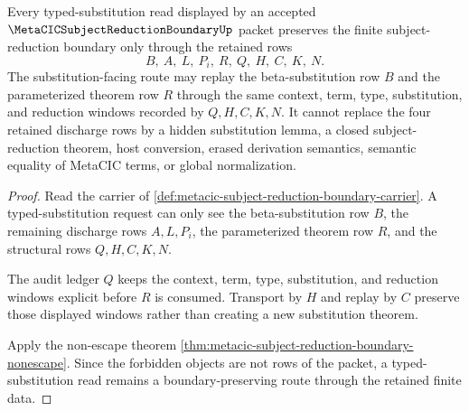 \begin{theorem}
\label{thm:metacic-subject-reduction-boundary-typed-substitution}
Every typed-substitution read displayed by an accepted $\MetaCICSubjectReductionBoundaryUp$ packet preserves the finite subject-reduction boundary only through the retained rows
$$
B,\ A,\ L,\ P_i,\ R,\ Q,\ H,\ C,\ K,\ N.
$$
The substitution-facing route may replay the beta-substitution row $B$ and the parameterized theorem row $R$ through the same context, term, type, substitution, and reduction windows recorded by $Q,H,C,K,N$. It cannot replace the four retained discharge rows by a hidden substitution lemma, a closed subject-reduction theorem, host conversion, erased derivation semantics, semantic equality of MetaCIC terms, or global normalization.
\end{theorem}
\begin{proof}
Read the carrier of \autoref{def:metacic-subject-reduction-boundary-carrier}. A typed-substitution request can only see the beta-substitution row $B$, the remaining discharge rows $A,L,P_i$, the parameterized theorem row $R$, and the structural rows $Q,H,C,K,N$.

The audit ledger $Q$ keeps the context, term, type, substitution, and reduction windows explicit before $R$ is consumed. Transport by $H$ and replay by $C$ preserve those displayed windows rather than creating a new substitution theorem.

Apply the non-escape theorem \autoref{thm:metacic-subject-reduction-boundary-nonescape}. Since the forbidden objects are not rows of the packet, a typed-substitution read remains a boundary-preserving route through the retained finite data.
\end{proof}

